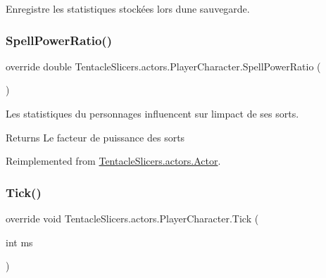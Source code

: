 Enregistre les statistiques stockées lors d\textquotesingle{}une sauvegarde. 

\mbox{\label{class_tentacle_slicers_1_1actors_1_1_player_character_aaeb9cd192c0caf68ed7aa994ebb6daa6}} 
\subsubsection{\texorpdfstring{Spell\+Power\+Ratio()}{SpellPowerRatio()}}
{\footnotesize\ttfamily override double Tentacle\+Slicers.\+actors.\+Player\+Character.\+Spell\+Power\+Ratio (\begin{DoxyParamCaption}{ }\end{DoxyParamCaption})\hspace{0.3cm}{\ttfamily [virtual]}}



Les statistiques du personnages influencent sur l\textquotesingle{}impact de ses sorts. 

\begin{DoxyReturn}{Returns}
Le facteur de puissance des sorts 
\end{DoxyReturn}


Reimplemented from \hyperlink{class_tentacle_slicers_1_1actors_1_1_actor_a83e7b818449b5e92e3a7003c0cc6f571}{Tentacle\+Slicers.\+actors.\+Actor}.

\mbox{\label{class_tentacle_slicers_1_1actors_1_1_player_character_ae5043ba6bbb1d2007f0f29f61e28369c}} 
\subsubsection{\texorpdfstring{Tick()}{Tick()}}
{\footnotesize\ttfamily override void Tentacle\+Slicers.\+actors.\+Player\+Character.\+Tick (\begin{DoxyParamCaption}\item[{int}]{ms }\end{DoxyParamCaption})\hspace{0.3cm}{\ttfamily [virtual]}}




